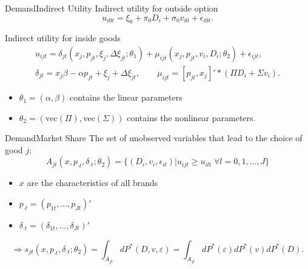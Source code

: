 \documentclass{beamer}
\begin{document}
\begin{frame}{Demand}{Indirect Utility}
	Indirect utility for outside option
	\begin{equation}\nonumber
		u_{i0t}=\xi_0+\pi_0D_i+\sigma_0v_{i0}+\epsilon_{i0t}.
	\end{equation}
	
	Indirect utility for inside goods
	\begin{equation}
		\begin{split}
			u_{ijt}=\delta_{jt}(x_j,p_{jt},\xi_j,\Delta\xi_{jt};\theta_1)+\mu_{ijt}(x_j,p_{jt},v_i,D_i;\theta_2)+\epsilon_{ijt},\\
			\delta_{jt}=x_j\beta-\alpha p_{jt}+\xi_j+\Delta\xi_{jt},\qquad \mu_{ijt}=[p_{jt},x_j]'*(\Pi D_i+\Sigma v_i).
		\end{split}
	\end{equation}

	\begin{itemize}
		\item $\theta_1=(\alpha,\beta)$ contains the linear parameters
		\item $\theta_2=(\mbox{vec}(\Pi),\mbox{vec}(\Sigma))$ contains the nonlinear parameters.
	\end{itemize}
\end{frame}
\begin{frame}{Demand}{Market Share}
	The set of unobserved variables that lead to the choice of good $j$:
	\begin{equation}\nonumber
		A_{jt}(x,p_{\cdot t},\delta_{\cdot t};\theta_2)=\{(D_i,v_i,\epsilon_{it})|u_{ijt}\geq u_{ilt}\;\forall l=0,1,...,J \}
	\end{equation}

	\begin{itemize}
		\item $x$ are the characteristics of all brands
		\item $p_{\cdot t}=(p_{1t},...,p_{Jt})'$
		\item $\delta_{\cdot t}=(\delta_{1t},...,\delta_{Jt})'$
	\end{itemize}
	\begin{equation}
		\Rightarrow s_{jt}(x,p_{\cdot t},\delta_{\cdot t};\theta_2)=\int_{A_{jt}}dP^*(D,v,\varepsilon)=\int_{A_{jt}}dP^*(\varepsilon)dP^*(v)dP^*(D).
	\end{equation}
\end{frame}
\end{document}
